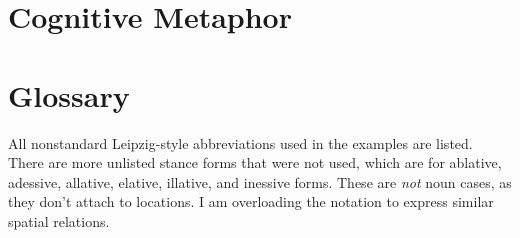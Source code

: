 \documentclass[12pt]{article}
\begin{document}
    \section{Cognitive Metaphor}\label{sec:cognitive-metaphor}
    
    \newpage


    \section{Glossary}\label{sec:glossary}

    All nonstandard Leipzig-style abbreviations used in the examples are listed.
    There are more unlisted stance forms that were not used,
    which are for ablative, adessive, allative, elative, illative, and inessive forms.
    These are \textit{not} noun cases, as they don't attach to locations.
    I am overloading the notation to express similar spatial relations.

    \printnoidxglossary[style=mcolblock,nonumberlist]

    \newpage
\end{document}
